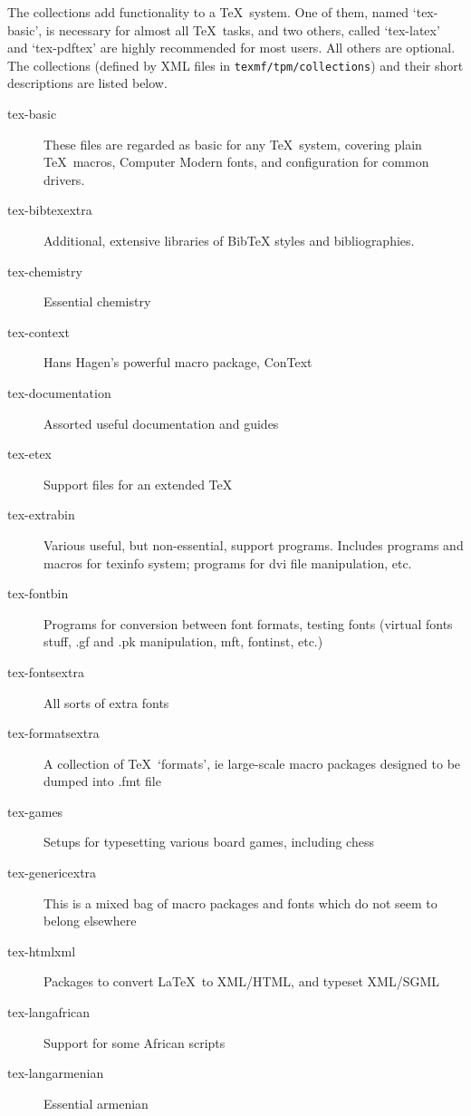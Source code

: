 \documentclass{article}
\begin{document}
The collections add functionality to a \TeX\ system. One of them, named
`tex-basic', is necessary for almost all \TeX\ tasks,
and two others, called `tex-latex' and `tex-pdftex' are highly
recommended for most users. All others are optional. 
The collections (defined by XML files in \texttt{texmf/tpm/collections})
and their short descriptions are listed below.

\begin{description}
     \item[tex-basic]
   These files are regarded as basic for any \TeX\ system, covering
plain \TeX\ macros, Computer Modern fonts, and configuration for common
drivers.
    \item[tex-bibtexextra]
      Additional, extensive libraries of BibTeX styles and bibliographies.
    \item[tex-chemistry]
      Essential chemistry
    \item[tex-context]
      Hans Hagen's powerful macro package, ConText
    \item[tex-documentation]
      Assorted useful documentation and guides
    \item[tex-etex]
      Support files for an extended \TeX\
    \item[tex-extrabin]
      Various useful, but non-essential, support programs. Includes
            programs and macros for texinfo system; programs for dvi file 
                  manipulation, etc.
    \item[tex-fontbin]
     Programs for conversion between font formats, testing fonts 
           (virtual fonts stuff, .gf and .pk manipulation, 
                 mft, fontinst, etc.)
    \item[tex-fontsextra]
      All sorts of extra fonts
    \item[tex-formatsextra]
      A collection of \TeX\ `formats', ie large-scale
macro packages designed to be dumped into .fmt file
    \item[tex-games]
      Setups for typesetting various board games, including chess
    \item[tex-genericextra]
      This is a mixed bag of macro packages and fonts which do not seem
to belong elsewhere
    \item[tex-htmlxml]
      Packages to convert \LaTeX\ to XML/HTML, and typeset XML/SGML
    \item[tex-langafrican]
      Support for some African scripts  
    \item[tex-langarmenian]
      Essential armenian

\end{description}
\end{document}
